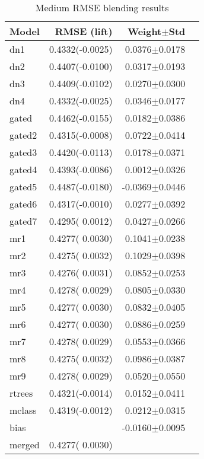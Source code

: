 \documentclass{article}
\begin{document}
\begin{table}[t]
\caption{Medium RMSE blending results}
\label{problems}
\vskip 0.15in
\begin{center}
\begin{small}
\begin{sc}
\begin{tabular}{lrrr}
\hline
\abovespace\belowspace
Model & RMSE (lift) & Weight$\pm$Std \\
\hline
\abovespace
dn1        & 0.4332(-0.0025) &  0.0376$\pm$0.0178 \\
dn2        & 0.4407(-0.0100) &  0.0317$\pm$0.0193 \\
dn3        & 0.4409(-0.0102) &  0.0270$\pm$0.0300 \\
dn4        & 0.4332(-0.0025) &  0.0346$\pm$0.0177 \\
\abovespace
gated      & 0.4462(-0.0155) &  0.0182$\pm$0.0386 \\
gated2     & 0.4315(-0.0008) &  0.0722$\pm$0.0414 \\
gated3     & 0.4420(-0.0113) &  0.0178$\pm$0.0371 \\
gated4     & 0.4393(-0.0086) &  0.0012$\pm$0.0326 \\
gated5     & 0.4487(-0.0180) & -0.0369$\pm$0.0446 \\
gated6     & 0.4317(-0.0010) &  0.0277$\pm$0.0392 \\
gated7     & 0.4295( 0.0012) &  0.0427$\pm$0.0266 \\
\abovespace
mr1        & 0.4277( 0.0030) &  0.1041$\pm$0.0238 \\
mr2        & 0.4275( 0.0032) &  0.1029$\pm$0.0398 \\
mr3        & 0.4276( 0.0031) &  0.0852$\pm$0.0253 \\
mr4        & 0.4278( 0.0029) &  0.0805$\pm$0.0330 \\
mr5        & 0.4277( 0.0030) &  0.0832$\pm$0.0405 \\
mr6        & 0.4277( 0.0030) &  0.0886$\pm$0.0259 \\
mr7        & 0.4278( 0.0029) &  0.0553$\pm$0.0366 \\
mr8        & 0.4275( 0.0032) &  0.0986$\pm$0.0387 \\
mr9        & 0.4278( 0.0029) &  0.0520$\pm$0.0550 \\
\abovespace
rtrees     & 0.4321(-0.0014) &  0.0152$\pm$0.0411 \\
mclass     & 0.4319(-0.0012) &  0.0212$\pm$0.0315 \\
\abovespace
bias       &                 & -0.0160$\pm$0.0095 \\
\abovespace\belowspace
merged     & 0.4277( 0.0030) &                    \\
\hline
\end{tabular}
\end{sc}
\end{small}
\end{center}
\vskip -0.1in
\end{table}
\end{document}
